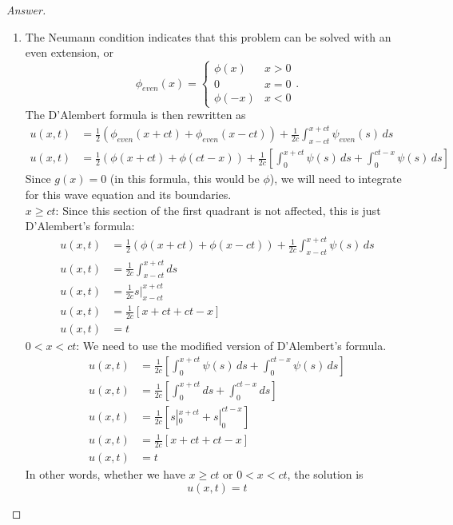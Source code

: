 \documentclass{article}
\theoremstyle{definition}
\renewcommand\qedsymbol{$\blacksquare$}
\newenvironment{ans}{\begin{proof}[Answer]\renewcommand{\qedsymbol}{}}{\end{proof}}
\begin{document}
\begin{ans}
\begin{enumerate}[(1), start=9]
    \item The Neumann condition indicates that this problem can be solved with an even extension, or
    \[\phi_{even}(x) = \begin{cases}
        \phi(x) & x > 0\\
        0 & x = 0\\
        \phi(-x) & x < 0
    \end{cases}.\]
    The D'Alembert formula is then rewritten as
    \begin{align*}
        u(x,t) &= \frac{1}{2}(\phi_{even}(x+ct) + \phi_{even}(x-ct)) + \frac{1}{2c}\int_{x-ct}^{x+ct}\psi_{even}(s)\,ds\\
        u(x,t) &= \frac{1}{2}(\phi(x+ct) + \phi(ct-x)) + \frac{1}{2c}\left[\int_0^{x+ct}\psi(s)\,ds + \int_0^{ct-x}\psi(s)\,ds\right]
    \end{align*}
    Since $g(x) = 0$ (in this formula, this would be $\phi$), we will need to integrate for this wave equation and its boundaries.\\
    \underline{$x \geq ct$}: Since this section of the first quadrant is not affected, this is just D'Alembert's formula:
    \begin{align*}
        u(x,t) &= \frac{1}{2}(\phi(x+ct) + \phi(x-ct)) + \frac{1}{2c}\int_{x-ct}^{x+ct}\psi(s)\,ds\\
        u(x,t) &= \frac{1}{2c}\int_{x-ct}^{x+ct}ds\\
        u(x,t) &= \frac{1}{2c}s|_{x-ct}^{x+ct}\\
        u(x,t) &= \frac{1}{2c} [x+ct+ct-x]\\
        u(x,t)&= t
    \end{align*}
    \underline{$0 < x < ct$}: We need to use the modified version of D'Alembert's formula.
    \begin{align*}
        u(x,t)&= \frac{1}{2c}\left[\int_0^{x+ct}\psi(s)\,ds + \int_0^{ct-x}\psi(s)\,ds\right]\\
        u(x,t)&= \frac{1}{2c}\left[\int_0^{x+ct}ds + \int_0^{ct-x}ds\right]\\
        u(x,t)&= \frac{1}{2c}\left[s|_0^{x+ct} + s|_0^{ct-x}\right]\\
        u(x,t)&= \frac{1}{2c}\left[x+ct + ct-x\right]\\
        u(x,t)&= t
    \end{align*}
    In other words, whether we have $x \geq ct \text{ or } 0 < x < ct$, the solution is 
    \[\boxed{u(x,t) = t}\]
    

\end{enumerate}
\end{ans}
\end{document}
